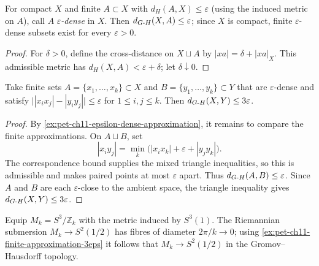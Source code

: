 \begin{example}
  \label{ex:pet-ch11-epsilon-dense-approximation}
  For compact $X$ and finite $A\subset X$ with $d_H(A,X)\le\varepsilon$
  (using the induced metric on $A$), call $A$ \emph{$\varepsilon$-dense} in
  $X$. Then $d_{G\text{-}H}(X,A)\le\varepsilon$; since $X$ is compact, finite
  $\varepsilon$-dense subsets exist for every $\varepsilon>0$.
\end{example}
\begin{proof}
  \sketch
  For \(\delta>0\), define the cross-distance on \(X\sqcup A\) by
  \(|xa|=\delta+|xa|_X\). This admissible metric has
  \(d_H(X,A)<\varepsilon+\delta\); let \(\delta\downarrow0\).
\end{proof}


\begin{example}
  \label{ex:pet-ch11-finite-approximation-3eps}
  Take finite sets
  $A=\{x_1,\dots,x_k\}\subset X$ and $B=\{y_1,\dots,y_k\}\subset Y$ that are
  $\varepsilon$-dense and satisfy
  $\big||x_ix_j|-|y_iy_j|\big|\le\varepsilon$ for $1\le i,j\le k$. Then
  $d_{G\text{-}H}(X,Y)\le3\varepsilon$.
\end{example}
\begin{proof}
  \sketch
  By \cref{ex:pet-ch11-epsilon-dense-approximation}, it remains to compare
  the finite approximations. On \(A\sqcup B\), set
  \[
    |x_i y_j|=\min_k\bigl(|x_i x_k|+\varepsilon+|y_jy_k|\bigr).
  \]
  The correspondence bound supplies the mixed triangle inequalities, so this is admissible and makes paired points at most \(\varepsilon\) apart. Thus \(d_{G\text{-}H}(A,B)\le\varepsilon\). Since \(A\) and \(B\) are each \(\varepsilon\)-close to the ambient space, the triangle inequality gives \(d_{G\text{-}H}(X,Y)\le3\varepsilon\).
\end{proof}


\begin{example}
  \label{ex:pet-ch11-lens-spaces-limit}
  Equip $M_k=S^3/\mathbb{Z}_k$ with the metric induced by $S^3(1)$. The
  Riemannian submersion $M_k\to S^2(1/2)$ has fibres of diameter
  $2\pi/k\to0$; using \cref{ex:pet-ch11-finite-approximation-3eps} it follows
  that $M_k\to S^2(1/2)$ in the Gromov--Hausdorff topology.
\end{example}

